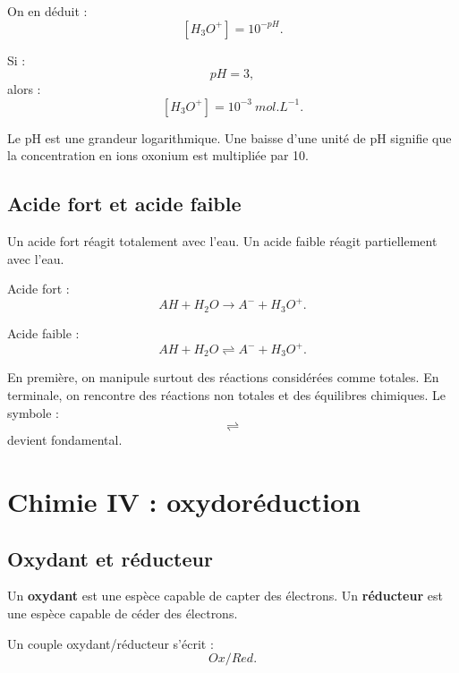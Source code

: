 \documentclass[11pt,a4paper]{article}
\begin{document}
On en déduit :
\[
[H_3O^+]=10^{-pH}.
\]

\begin{exemple}
Si :
\[
pH=3,
\]
alors :
\[
[H_3O^+]=10^{-3}\ \si{mol.L^{-1}}.
\]
\end{exemple}

\begin{alerte}
Le pH est une grandeur logarithmique.  
Une baisse d'une unité de pH signifie que la concentration en ions oxonium est multipliée par 10.
\end{alerte}

\subsection{Acide fort et acide faible}

\begin{definition}
Un acide fort réagit totalement avec l'eau.  
Un acide faible réagit partiellement avec l'eau.
\end{definition}

Acide fort :
\[
AH+H_2O \longrightarrow A^-+H_3O^+.
\]

Acide faible :
\[
AH+H_2O \rightleftharpoons A^-+H_3O^+.
\]

\begin{transition}
En première, on manipule surtout des réactions considérées comme totales.  
En terminale, on rencontre des réactions non totales et des équilibres chimiques. Le symbole :
\[
\rightleftharpoons
\]
devient fondamental.
\end{transition}

\section{Chimie IV : oxydoréduction}

\subsection{Oxydant et réducteur}

\begin{definition}
Un \textbf{oxydant} est une espèce capable de capter des électrons.  
Un \textbf{réducteur} est une espèce capable de céder des électrons.
\end{definition}

Un couple oxydant/réducteur s'écrit :
\[
Ox/Red.
\]
\end{document}
